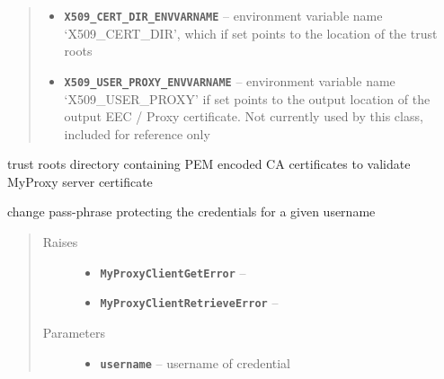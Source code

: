 \documentclass[letterpaper,10pt,english]{sphinxmanual}
\begin{document}
\begin{fulllineitems}
\begin{quote}
\begin{description}
\begin{itemize}
\item {} 
\textbf{\texttt{X509\_CERT\_DIR\_ENVVARNAME}} -- environment variable name `X509\_CERT\_DIR',     which if set points to the location of the trust roots

\item {} 
\textbf{\texttt{X509\_USER\_PROXY\_ENVVARNAME}} -- environment variable name `X509\_USER\_PROXY' if set points to the output location of the output EEC / Proxy certificate.  Not currently used by this class, included for reference only

\end{itemize}

\end{description}\end{quote}

\begin{fulllineitems}
\label{client:myproxy.client.MyProxyClient.caCertDir}
trust roots directory containing PEM encoded CA certificates to validate MyProxy server certificate

\end{fulllineitems}


\begin{fulllineitems}
\label{client:myproxy.client.MyProxyClient.changePassphrase}
change pass-phrase protecting the credentials for a given username
\begin{quote}\begin{description}
\item[{Raises}] \leavevmode\begin{itemize}
\item {} 
\textbf{\texttt{MyProxyClientGetError}} -- 

\item {} 
\textbf{\texttt{MyProxyClientRetrieveError}} -- 

\end{itemize}

\item[{Parameters}] \leavevmode\begin{itemize}
\item {} 
\textbf{\texttt{username}} -- username of credential


\end{itemize}
\end{description}
\end{quote}
\end{fulllineitems}
\end{fulllineitems}
\end{document}

